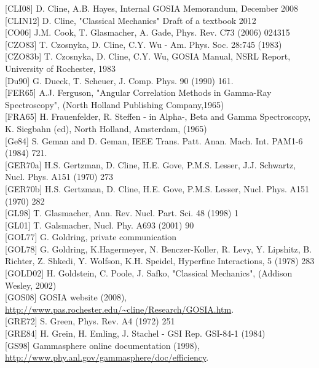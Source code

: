 \documentclass[10pt]{article}
\begin{document}
[CLI08] D. Cline, A.B. Hayes, Internal GOSIA Memorandum, December 2008\\[0pt]
[CLIN12] D. Cline, "Classical Mechanics" Draft of a textbook 2012\\[0pt]
[CO06] J.M. Cook, T. Glasmacher, A. Gade, Phys. Rev. C73 (2006) 024315\\[0pt]
[CZO83] T. Czosnyka, D. Cline, C.Y. Wu - Am. Phys. Soc. 28:745 (1983)\\[0pt]
[CZO83b] T. Czosnyka, D. Cline, C.Y. Wu, GOSIA Manual, NSRL Report, University of Rochester, 1983\\[0pt]
[Du90] G. Dueck, T. Scheuer, J. Comp. Phys. 90 (1990) 161.\\[0pt]
[FER65] A.J. Ferguson, "Angular Correlation Methods in Gamma-Ray Spectroscopy", (North Holland Publishing Company,1965)\\[0pt]
[FRA65] H. Frauenfelder, R. Steffen - in Alpha-, Beta and Gamma Spectroscopy, K. Siegbahn (ed), North Holland, Amsterdam, (1965)\\[0pt]
[Ge84] S. Geman and D. Geman, IEEE Trans. Patt. Anan. Mach. Int. PAM1-6 (1984) 721.\\[0pt]
[GER70a] H.S. Gertzman, D. Cline, H.E. Gove, P.M.S. Lesser, J.J. Schwartz, Nucl. Phys. A151 (1970) 273\\[0pt]
[GER70b] H.S. Gertzman, D. Cline, H.E. Gove, P.M.S. Lesser, Nucl. Phys. A151 (1970) 282\\[0pt]
[GL98] T. Glasmacher, Ann. Rev. Nucl. Part. Sci. 48 (1998) 1\\[0pt]
[GL01] T. Galsmacher, Nucl. Phy. A693 (2001) 90\\[0pt]
[GOL77] G. Goldring, private communication\\[0pt]
[GOL78] G. Goldring, K.Hagermeyer, N. Benczer-Koller, R. Levy, Y. Lipshitz, B. Richter, Z. Shkedi, Y. Wolfson, K.H. Speidel, Hyperfine Interactions, 5 (1978) 283\\[0pt]
[GOLD02] H. Goldstein, C. Poole, J. Safko, "Classical Mechanics", (Addison Wesley, 2002)\\[0pt]
[GOS08] GOSIA website (2008), \href{http://www.pas.rochester.edu/~cline/Research/GOSIA.htm}{http://www.pas.rochester.edu/\~{}cline/Research/GOSIA.htm}.\\[0pt]
[GRE72] S. Green, Phys. Rev. A4 (1972) 251\\[0pt]
[GRE84] H. Grein, H. Emling, J. Stachel - GSI Rep. GSI-84-1 (1984)\\[0pt]
[GS98] Gammasphere online documentation (1998), \href{http://www.phy.anl.gov/gammasphere/doc/efficiency}{http://www.phy.anl.gov/gammasphere/doc/efficiency}.\\[0pt]
\end{document}
